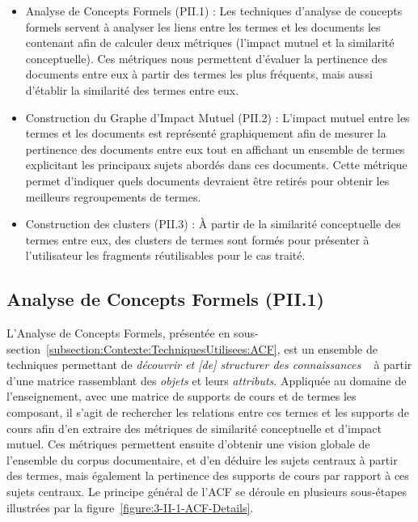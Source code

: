 \begin{itemize}
\item Analyse de Concepts Formels (PII.1) : Les techniques d'analyse de concepts formels servent à analyser les liens entre les termes et les documents les contenant afin de calculer deux métriques (l'impact mutuel et la similarité conceptuelle). Ces métriques nous permettent d'évaluer la pertinence des documents entre eux à partir des termes les plus fréquents, mais aussi d'établir la similarité des termes entre eux.
\item Construction du Graphe d'Impact Mutuel (PII.2) : L'impact mutuel entre les termes et les documents est représenté graphiquement afin de mesurer la pertinence des documents entre eux tout en affichant un ensemble de termes explicitant les principaux sujets abordés dans ces documents. Cette métrique permet d'indiquer quels documents devraient être retirés pour obtenir les meilleurs regroupements de termes.
\item Construction des clusters (PII.3) : À partir de la similarité conceptuelle des termes entre eux, des clusters de termes sont formés pour présenter à l'utilisateur les fragments réutilisables pour le cas traité.
\end{itemize}


\subsection{Analyse de Concepts Formels (PII.1)}
\label{subsection:CREA:PII.1-ACF}

L'Analyse de Concepts Formels, présentée en sous-section~\ref{subsection:Contexte:TechniquesUtilisees:ACF}, est un ensemble de techniques permettant de \og \textit{découvrir et [de] structurer des connaissances} \fg~\cite{jaffal2019aide} à partir d'une matrice rassemblant des \textit{objets} et leurs \textit{attributs}.
Appliquée au domaine de l'enseignement, avec une matrice de supports de cours et de termes les composant, il s'agit de rechercher les relations entre ces termes et les supports de cours afin d'en extraire des métriques de similarité conceptuelle et d'impact mutuel.
Ces métriques permettent ensuite d'obtenir une vision globale de l'ensemble du corpus documentaire, et d'en déduire les sujets centraux à partir des termes, mais également la pertinence des supports de cours par rapport à ces sujets centraux.
Le principe général de l'ACF se déroule en plusieurs sous-étapes illustrées par la figure~\ref{figure:3-II-1-ACF-Details}.

